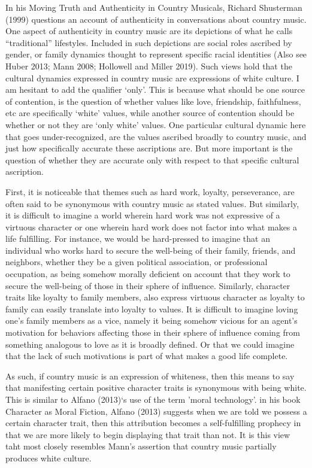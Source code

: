 \documentclass[12pt]{book}
\theoremstyle{definition}
\theoremstyle{remark}
\begin{document}
In his Moving Truth and Authenticity in Country Musicals, Richard Shusterman (1999) questions an account of authenticity in conversations about country music. One aspect of authenticity in country music are its depictions of what he calls ``traditional'' lifestyles. Included in such depictions are social roles ascribed by gender, or family dynamics thought to represent specific racial identities (Also see Huber 2013; Mann 2008; Hollowell and Miller 2019). Such views hold that the cultural dynamics expressed in country music are expressions of white culture. I am hesitant to add the qualifier `only'. This is because what should be one source of contention, is the question of whether values like love, friendship, faithfulness, etc are specifically `white' values, while another source of contention should be whether or not they are `only white' values. One particular cultural dynamic here that goes under-recognized, are the values ascribed broadly to country music, and just how specifically accurate these ascriptions are. But more important is the question of whether they are accurate only with respect to that specific cultural ascription.

First, it is noticeable that themes such as hard work, loyalty, perseverance, are often said to be synonymous with country music as stated values. But similarly, it is difficult to imagine a world wherein hard work was not expressive of a virtuous character or one wherein hard work does not factor into what makes a life fulfilling. For instance, we would be hard-pressed to imagine that an individual who works hard to secure the well-being of their family, friends, and neighbors, whether they be a given political association, or professional occupation, as being somehow morally deficient on account that they work to secure the well-being of those in their sphere of influence. Similarly, character traits like loyalty to family members, also express virtuous character as loyalty to family can easily translate into loyalty to values. It is difficult to imagine loving one's family members as a vice, namely it being somehow vicious for an agent's motivation for behaviors affecting those in their sphere of influence coming from something analogous to love as it is broadly defined. Or that we could imagine that the lack of such motivations is part of what makes a good life complete.

As such, if country music is an expression of whiteness, then this means to say that manifesting certain positive character traits is synonymous with being white. This is similar to Alfano (2013)`s use of the term 'moral technology'. in his book Character as Moral Fiction, Alfano (2013) suggests when we are told we possess a certain character trait, then this attribution becomes a self-fulfilling prophecy in that we are more likely to begin displaying that trait than not. It is this view taht most closely resembles Mann's assertion that country music partially produces white culture.
\end{document}
